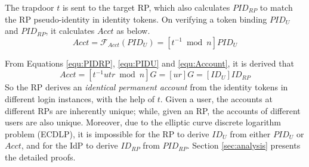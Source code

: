 


The trapdoor $t$ is sent to the target RP,
which also calculates $PID_{RP}$ to match the RP pseudo-identity in identity tokens.
On verifying a token binding $PID_U$ and $PID_{RP}$,
    it calculates $Acct$ as below.
\begin{equation}
Acct = \mathcal{F}_{Acct}(PID_{U})
   = [t^{-1} \bmod n]PID_{U}
   \label{equ:Account}
\end{equation}

From Equations \ref{equ:PIDRP}, \ref{equ:PIDU} and \ref{equ:Account}, it is derived that
\begin{equation*}
   Acct =  [t^{-1}utr \bmod n]G = [ur]G = [ID_U]ID_{RP}
   \label{equ:AccountNotChanged}
\end{equation*}
So the RP derives an \emph{identical permanent account} from the identity tokens in different login instances,
    with the help of $t$. %
Given a user, the accounts at different RPs are inherently unique;
while, given an RP, the accounts of different users are also unique.
Moreover,
    due to the elliptic curve discrete logarithm problem (ECDLP),
it is impossible for the RP to derive $ID_U$ from either $PID_U$ or $Acct$,
    and for the IdP to derive $ID_{RP}$ from $PID_{RP}$.
Section \ref{sec:analysis} presents the detailed proofs.

